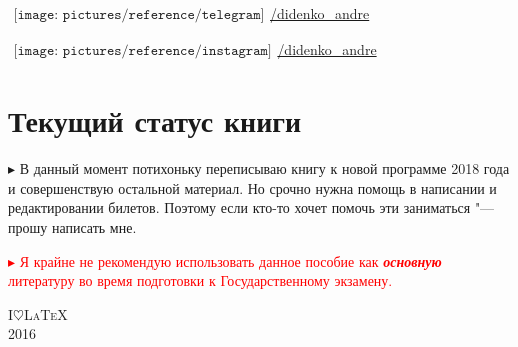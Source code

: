 \begin{flushleft}
\begin{itemize}[wide, labelwidth=!, labelindent=0pt, label=$\blacktriangleright$, noitemsep]
\qquad\href{https://t.me/didenko_andre}{$
\begin{array}{l}
\texttt{[image: pictures/reference/telegram]}
\end{array}
$\large /didenko\_\!andre}

\qquad\href{https://instagram.com/didenko_andre}{$
    \begin{array}{l}
    \texttt{[image: pictures/reference/instagram]}
    \end{array}
$\large /didenko\_\!andre}
\vspace*{-1\baselineskip}  
\end{itemize}

\section*{\Large Текущий статус книги}

$\blacktriangleright$ В данный момент потихоньку переписываю книгу к новой программе 2018 года и совершенствую остальной материал. Но срочно нужна помощь в написании и редактировании билетов. Поэтому если кто-то хочет помочь эти заниматься "--- прошу написать мне. 

\smallskip

\vfill

\textcolor{red}{
$\blacktriangleright$ Я крайне не рекомендую использовать данное пособие как \textit{\textbf{основную}} литературу во время подготовки к Государственному экзамену.
}

\end{flushleft}

\medskip
\vfill
{\huge\scshape I\;$\heartsuit$\;\LaTeX}\\[0.5\baselineskip]
{\LARGE\scshape 2016}\par
\restoregeometry
\endgroup
\newpage